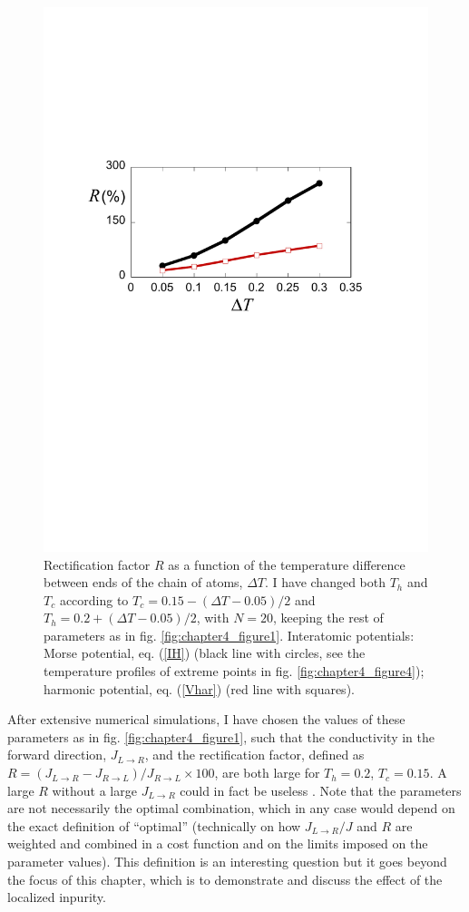 \begin{figure}
\centering
\includegraphics[width=0.65\linewidth]{Figures/FIG5new.pdf}
\caption{Rectification factor $R$ as a function of the temperature difference between ends of the chain of atoms, $\Delta T$.
I have changed both $T_h$ and $T_c$ according to $T_c=0.15-(\Delta T-0.05)/2$ and $T_h=0.2+(\Delta T-0.05)/2$, with $N=20$,  keeping the rest of parameters as in fig. \ref{fig:chapter4_figure1}.
Interatomic potentials: Morse potential, eq. (\ref{IH}) (black line with circles, see the temperature profiles of extreme points in fig. \ref{fig:chapter4_figure4}); harmonic potential, eq. (\ref{Vhar}) (red line with squares).}
\label{fig:chapter4_figure5}
\end{figure}

After extensive numerical simulations, I have chosen the values of these parameters as in fig. \ref{fig:chapter4_figure1}, such that the conductivity in the forward direction, $J_{L\rightarrow R}$, and the rectification factor, defined as $R=(J_{L\rightarrow R}-J_{R\rightarrow L}) / J_{R\rightarrow L}\times 100$,
are both large for $T_h=0.2$, $T_c=0.15$. A large $R$ without a large $J_{L\rightarrow R}$ could in fact be useless \cite{Roberts2011}.
Note that the parameters are not necessarily the optimal combination, which in any case would depend on the exact definition of ``optimal'' (technically on how $J_{L\rightarrow R}/J$ and $R$ are weighted and combined in a cost function and on the limits imposed on the
parameter values). This definition is an interesting question but it goes beyond the focus of this chapter, which is to demonstrate and discuss the effect of the localized inpurity.

